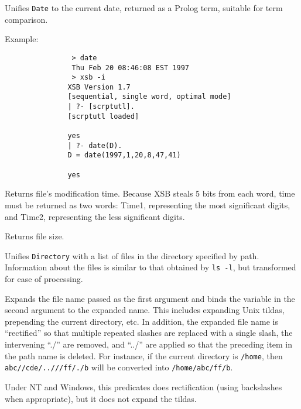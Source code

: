 \begin{description}
	Unifies {\tt Date} to the current date, returned as a Prolog
term, suitable for term comparison.

Example:
{\footnotesize
\begin{verbatim}
                > date 
                Thu Feb 20 08:46:08 EST 1997
                > xsb -i
               XSB Version 1.7
               [sequential, single word, optimal mode]
               | ?- [scrptutl].
               [scrptutl loaded]

               yes
               | ?- date(D).
               D = date(1997,1,20,8,47,41)

               yes
\end{verbatim}}


Returns file's modification time. Because 
XSB steals 5 bits from each word, time must be returned as two words:
Time1, representing the most significant digits, and Time2, representing
the less significant digits.


Returns file size.


	Unifies {\tt Directory} with a list of files in the directory
specified by path.  Information about the files is similar to that
obtained by {\tt ls -l}, but transformed for ease of processing.


Expands the file name passed as the first argument and binds the variable
in the second argument to the expanded name. This includes expanding Unix
tildas, prepending the current directory, etc. In addition, the expanded
file name is ``rectified'' so that multiple repeated slashes are replaced
with a single slash, the intervening ``./'' are removed, and ``../'' are
applied so that the preceding item in the path name is deleted. For
instance, if the current directory is {\tt /home}, then {\tt
  abc//cde/..///ff/./b} will be converted into {\tt /home/abc/ff/b}.

Under NT and Windows, this predicates does rectification (using
backslashes when appropriate), but it does not expand the tildas.


\end{description}
